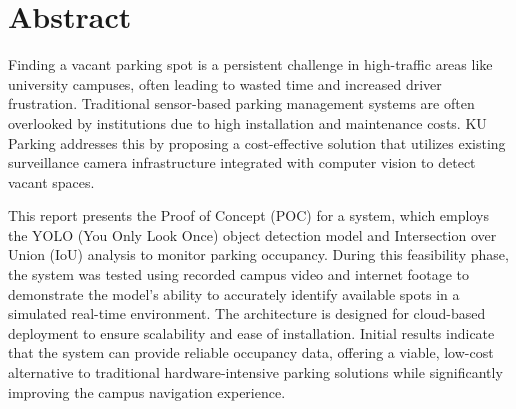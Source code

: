 \chapter*{Abstract}
\label{chap:abstract}

Finding a vacant parking spot is a persistent challenge in high-traffic areas like university campuses, often leading to wasted time and increased driver frustration. Traditional sensor-based parking management systems are often overlooked by institutions due to high installation and maintenance costs. KU Parking addresses this by proposing a cost-effective solution that utilizes existing surveillance camera infrastructure integrated with computer vision to detect vacant spaces.

This report presents the Proof of Concept (POC) for a system, which employs the YOLO (You Only Look Once) object detection model and Intersection over Union (IoU) analysis to monitor parking occupancy. During this feasibility phase, the system was tested using recorded campus video and internet footage to demonstrate the model's ability to accurately identify available spots in a simulated real-time environment. The architecture is designed for cloud-based deployment to ensure scalability and ease of installation. Initial results indicate that the system can provide reliable occupancy data, offering a viable, low-cost alternative to traditional hardware-intensive parking solutions while significantly improving the campus navigation experience.